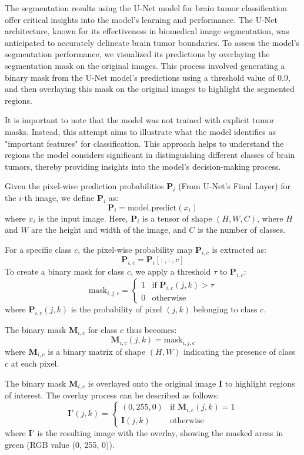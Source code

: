 The segmentation results using the U-Net model for brain tumor classification offer critical insights into the model's learning and performance. The U-Net architecture, known for its effectiveness in biomedical image segmentation, was anticipated to accurately delineate brain tumor boundaries. To assess the model's segmentation performance, we visualized its predictions by overlaying the segmentation mask on the original images. This process involved generating a binary mask from the U-Net model's predictions using a threshold value of 0.9, and then overlaying this mask on the original images to highlight the segmented regions.

It is important to note that the model was not trained with explicit tumor masks. Instead, this attempt aims to illustrate what the model identifies as "important features" for classification. This approach helps to understand the regions the model considers significant in distinguishing different classes of brain tumors, thereby providing insights into the model's decision-making process.

Given the pixel-wise prediction probabilities $\mathbf{P}_i$ (From U-Net's Final Layer) for the $i$-th image, we define $\mathbf{P}_i$ as:
\[
\mathbf{P}_i = \text{model.predict}(x_i)
\]
where $x_i$ is the input image. Here, $\mathbf{P}_i$ is a tensor of shape $(H, W, C)$, where $H$ and $W$ are the height and width of the image, and $C$ is the number of classes.

For a specific class $c$, the pixel-wise probability map $\mathbf{P}_{i,c}$ is extracted as:
\[
\mathbf{P}_{i,c} = \mathbf{P}_i[:, :, c]
\]
To create a binary mask for class $c$, we apply a threshold $\tau$ to $\mathbf{P}_{i,c}$:
\[
\text{mask}_{i,j,c} = 
\begin{cases} 
1 & \text{if } \mathbf{P}_{i,c}(j,k) > \tau \\
0 & \text{otherwise}
\end{cases}
\]
where $\mathbf{P}_{i,c}(j,k)$ is the probability of pixel $(j,k)$ belonging to class $c$.

The binary mask $\mathbf{M}_{i,c}$ for class $c$ thus becomes:
\[
\mathbf{M}_{i,c}(j,k) = \text{mask}_{i,j,c}
\]
where $\mathbf{M}_{i,c}$ is a binary matrix of shape $(H, W)$ indicating the presence of class $c$ at each pixel.

The binary mask $\mathbf{M}_{i,c}$ is overlayed onto the original image $\mathbf{I}$ to highlight regions of interest. The overlay process can be described as follows:
\[
\mathbf{I}'(j,k) = 
\begin{cases} 
(0, 255, 0) & \text{if } \mathbf{M}_{i,c}(j,k) = 1 \\
\mathbf{I}(j,k) & \text{otherwise}
\end{cases}
\]
where $\mathbf{I}'$ is the resulting image with the overlay, showing the masked areas in green (RGB value (0, 255, 0)).

